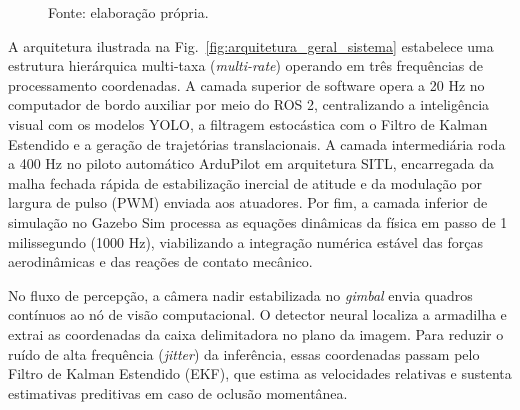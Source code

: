 \begin{figure}[H]

    \vspace{0.2cm}

    \begin{flushleft}
        \footnotesize Fonte: elaboração própria.
    \end{flushleft}
\end{figure}

A arquitetura ilustrada na Fig.~\ref{fig:arquitetura_geral_sistema} estabelece uma estrutura hierárquica multi-taxa (\textit{multi-rate}) operando em três frequências de processamento coordenadas. A camada superior de software opera a 20 Hz no computador de bordo auxiliar por meio do ROS 2, centralizando a inteligência visual com os modelos YOLO, a filtragem estocástica com o Filtro de Kalman Estendido e a geração de trajetórias translacionais. A camada intermediária roda a 400 Hz no piloto automático ArduPilot em arquitetura SITL, encarregada da malha fechada rápida de estabilização inercial de atitude e da modulação por largura de pulso (PWM) enviada aos atuadores. Por fim, a camada inferior de simulação no Gazebo Sim processa as equações dinâmicas da física em passo de 1 milissegundo (1000 Hz), viabilizando a integração numérica estável das forças aerodinâmicas e das reações de contato mecânico.

No fluxo de percepção, a câmera nadir estabilizada no \textit{gimbal} envia quadros contínuos ao nó de visão computacional. O detector neural localiza a armadilha e extrai as coordenadas da caixa delimitadora no plano da imagem. Para reduzir o ruído de alta frequência (\textit{jitter}) da inferência, essas coordenadas passam pelo Filtro de Kalman Estendido (EKF), que estima as velocidades relativas e sustenta estimativas preditivas em caso de oclusão momentânea.

